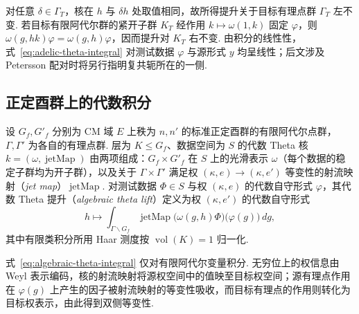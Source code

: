 对任意 $\delta\in\Gamma_T$，核在 $h$ 与 $\delta h$ 处取值相同，故所得提升关于目标有理点群 $\Gamma_T$ 左不变. 若目标有限阿代尔群的紧开子群 $K_T$ 经作用 $k\mapsto\omega(1,k)$ 固定 $\varphi$，则 $\omega(g,hk)\varphi=\omega(g,h)\varphi$，因而提升对 $K_T$ 右不变. 由积分的线性性，式~\eqref{eq:adelic-theta-integral} 对测试数据 $\varphi$ 与源形式 $y$ 均呈线性；后文涉及 Petersson 配对时将另行指明复共轭所在的一侧.

\subsection{正定酉群上的代数积分}

\begin{definition}
\label{def:algebraic-theta-lift}
\emitthmsource
设 $G_f,G'_f$ 分别为 CM 域 $E$ 上秩为 $n,n'$ 的标准正定酉群的有限阿代尔点群，$\Gamma,\Gamma'$ 为各自的有理点群.
层为 $K\le G_f$、数据空间为 $S$ 的代数 Theta 核 $k=(\omega,\operatorname{jetMap})$ 由两项组成：$G_f\times G'_f$ 在 $S$ 上的光滑表示 $\omega$（每个数据的稳定子群均为开子群），以及关于 $\Gamma\times\Gamma'$ 满足权 $(\kappa,e)\to(\kappa,e')$ 等变性的射流映射（\emph{jet map}）$\operatorname{jetMap}$.
对测试数据 $\Phi\in S$ 与权 $(\kappa,e)$ 的代数自守形式 $\varphi$，其代数 Theta 提升（\emph{algebraic theta lift}）定义为权 $(\kappa,e')$ 的代数自守形式
\begin{equation}
 h\longmapsto
 \int_{\Gamma\backslash G_f}
   \operatorname{jetMap}\bigl(\omega(g,h)\Phi\bigr)\bigl(\varphi(g)\bigr)\,dg ,
\label{eq:algebraic-theta-integral}
\end{equation}
其中有限类积分所用 Haar 测度按 $\operatorname{vol}(K)=1$ 归一化.
\end{definition}

式~\eqref{eq:algebraic-theta-integral} 仅对有限阿代尔变量积分. 无穷位上的权信息由 Weyl 表示编码，核的射流映射将源权空间中的值映至目标权空间；源有理点作用在 $\varphi(g)$ 上产生的因子被射流映射的等变性吸收，而目标有理点的作用则转化为目标权表示，由此得到双侧等变性.

